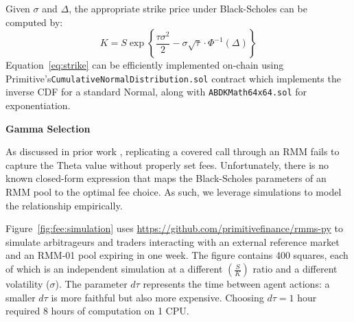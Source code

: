 \documentclass[hidelinks, 12pt]{article}
\begin{document}
Given $\sigma$ and $\Delta$, the appropriate strike price under Black-Scholes can be computed by: 
\begin{equation}
  K = S \exp \left\{ \frac{\tau \sigma^2}{2} - \sigma \sqrt{\tau} \cdot \Phi^{-1}(\Delta) \right\}
  \label{eq:strike}
\end{equation}
Equation~\ref{eq:strike} can be efficiently implemented on-chain using Primitive's\newline \texttt{CumulativeNormalDistribution.sol} contract which implements the inverse CDF for a standard Normal, along with \texttt{ABDKMath64x64.sol} for exponentiation.

\textbf{Gamma Selection}$\quad$

As discussed in prior work \cite{angeris2021replicating}, replicating a covered call through an RMM fails to capture the Theta value without properly set fees.
Unfortunately, there is no known closed-form expression that maps the Black-Scholes parameters of an RMM pool to the optimal fee choice.
As such, we leverage simulations to model the relationship empirically.

Figure~\ref{fig:fee:simulation} uses \url{https://github.com/primitivefinance/rmms-py} to simulate arbitrageurs and traders interacting with an external reference market and an RMM-01 pool expiring in one week. The figure contains 400 squares, each of which is an independent simulation at a different $\left(\frac{S}{K}\right)$ ratio and a different volatility ($\sigma$). The parameter $d\tau$ represents the time between agent actions: a smaller $d\tau$ is more faithful but also more expensive. Choosing $d\tau = 1$ hour required 8 hours of computation on 1 CPU.
\end{document}

